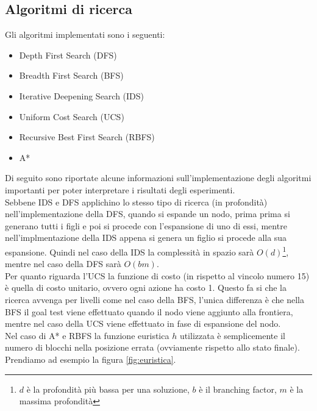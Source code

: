 \documentclass{article}
\begin{document}
	\subsection{Algoritmi di ricerca}
	Gli algoritmi implementati sono i seguenti:
	\begin{itemize}
		\item Depth First Search (DFS)
		\item Breadth First Search (BFS)
		\item Iterative Deepening Search (IDS)
		\item Uniform Cost Search (UCS)
		\item Recursive Best First Search (RBFS)
		\item A*
	\end{itemize}
	Di seguito sono riportate alcune informazioni sull'implementazione degli algoritmi importanti per poter interpretare i risultati degli esperimenti.\\Sebbene IDS e DFS applichino lo stesso tipo di ricerca (in profondità) nell'implementazione della DFS, quando si espande un nodo, prima prima si generano tutti i figli e poi si procede con l'espansione di uno di essi, mentre nell'implmentazione della IDS appena si genera un figlio si procede alla sua espansione. Quindi nel caso della IDS la complessità in spazio sarà $O(d)$\footnote{$d$ è la profondità più bassa per una soluzione, $b$ è il branching factor, $m$ è la massima profondità}, mentre nel caso della DFS sarà $O(bm)$.\\
	Per quanto riguarda l'UCS la funzione di costo (in rispetto al vincolo numero 15) è quella di costo unitario, ovvero ogni azione ha costo 1. Questo fa si che la ricerca avvenga per livelli come nel caso della BFS, l'unica differenza è che nella BFS il goal test viene effettuato quando il nodo viene aggiunto alla frontiera, mentre nel caso della UCS viene effettuato in fase di espansione del nodo.\\
	Nel caso di A* e RBFS la funzione euristica $h$ utilizzata è semplicemente il numero di blocchi nella posizione errata (ovviamente rispetto allo stato finale). Prendiamo ad esempio la figura \ref{fig:euristica}.
\end{document}
